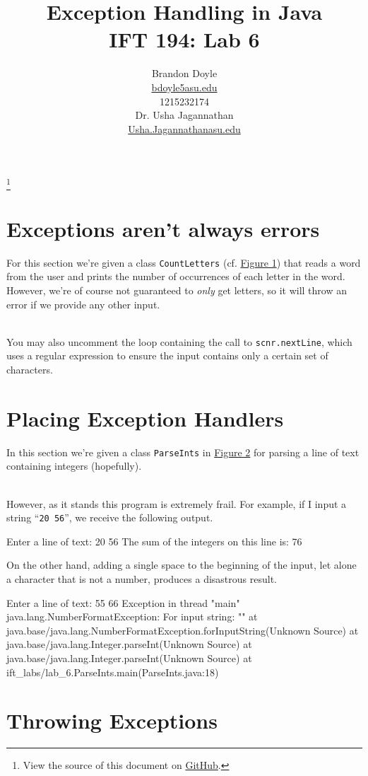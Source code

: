 \documentclass[leqno, 11pt]{article}
\title{\vspace{6ex}Exception Handling in Java\\
  \Large IFT 194: Lab 6}
\author{Brandon Doyle\\
\href{mailto:bdoyle@asu.edu}{bdoyle5\at{}asu.edu}\\
1215232174\\[1em]
Dr. Usha Jagannathan\\
\href{mailto:Usha.Jagannathan@asu.edu}{Usha.Jagannathan\at{}asu.edu}}
\newcommand\blfootnote[1]{%
  \begingroup
    \renewcommand\thefootnote{}\footnote{#1}
    \addtocounter{footnote}{-1}
  \endgroup
}
\newcommand{\iftcodefigure}[3]{%
  \begin{codefigure}
    \label{#1}
    \addtocounter{figure}{-1}
    
  \end{codefigure}
}
\begin{document}
\begin{titlepage}
\clearpage\maketitle
\thispagestyle{empty}
\end{titlepage}
\tableofcontents
\blfootnote{View the source of this document on \href{https://github.com/bjd2385/IFT_194_labs/blob/master/\jobname.tex}{GitHub}.}
\newpage
\section{Exceptions aren't always errors}
For this section we're given a class \texttt{CountLetters} (cf. \hyperref[fig:one]{Figure 1}) that reads a word from the user and prints the number of occurrences of each letter in the word. However, we're of course not guaranteed to \textit{only} get letters, so it will throw an error if we provide any other input. 
\iftcodefigure{fig:one}{CountLetters.java}{%
  /mnt/c/Users/bdoyle/eclipse-workspace/ift_labs/src/lab_6/CountLetters.java}\\
You may also uncomment the loop containing the call to \texttt{scnr.nextLine}, which uses a regular expression to ensure the input contains only a certain set of characters.
\section{Placing Exception Handlers}
In this section we're given a class \texttt{ParseInts} in \hyperref[fig:two]{Figure 2} for parsing a line of text containing integers (hopefully).
\iftcodefigure{fig:two}{ParseInts.java}{%
  /mnt/c/Users/bdoyle/eclipse-workspace/ift_labs/src/lab_6/ParseInts.java}\\
However, as it stands this program is extremely frail. For example, if I input a string ``\texttt{20 56}'', we receive the following output.
\begin{verbbox}[\mbox{}\scriptsize]
Enter a line of text: 20 56
The sum of the integers on this line is: 76
\end{verbbox}
\begin{center}
  \theverbbox
\end{center}
On the other hand, adding a single space to the beginning of the input, let alone a character that is not a number, produces a disastrous result.
\begin{verbbox}[\mbox{}\scriptsize]
Enter a line of text:  55 66
Exception in thread "main" java.lang.NumberFormatException: For input string: ""
  at java.base/java.lang.NumberFormatException.forInputString(Unknown Source)
  at java.base/java.lang.Integer.parseInt(Unknown Source)
  at java.base/java.lang.Integer.parseInt(Unknown Source)
  at ift_labs/lab_6.ParseInts.main(ParseInts.java:18)
\end{verbbox}
\begin{center}
  \theverbbox
\end{center}

\section{Throwing Exceptions}
\end{document}
